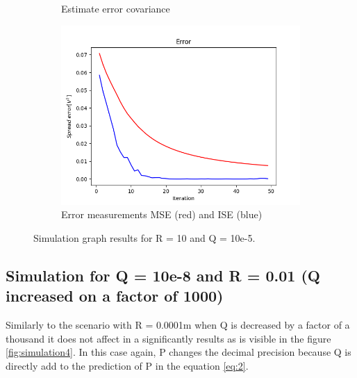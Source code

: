 \documentclass{article}
\begin{document}
\begin{figure}
\begin{subfigure} {.5\textwidth}
            \caption{Estimate error covariance}
        \end{subfigure}
        \begin{subfigure}{.5\textwidth}            
            \centering
            \includegraphics[width=0.8\linewidth]{./img/r10q_E.png}
            \caption{Error measurements MSE (red) and ISE (blue)}
        \end{subfigure}
        \caption{Simulation graph results for R = 10 and Q = 10e-5.}
        \label{fig:simulation3}
    \end{figure}
    

    \subsection{Simulation for Q = 10e-8 and R = 0.01 (Q increased on a factor of 1000)}
    
    Similarly to the scenario with R = 0.0001m when Q is decreased by a factor of a thousand it does not 
    affect in a significantly results as is visible in the figure \ref{fig:simulation4}. In this case
    again, P changes the decimal precision because Q is directly add to the prediction of P in the equation 
    \ref{eq:2}.
\end{document}
